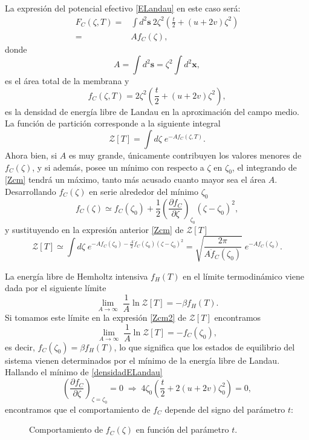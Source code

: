 La expresión del potencial efectivo \eqref{ELandau} en este caso será:
\begin{align}
  F_C(\zeta,T)=&\int\! d^2 \mathbf{s}\ 2\zeta^2\!\left( \frac{t}{2} + (u+2v)\zeta^2\right)\\
  =&Af_C(\zeta),
\end{align}
donde 
$$A=\int d^2 \mathbf{s}=\zeta^2\int d^2 \mathbf{x} ,$$
es el área total de la membrana y 
\begin{equation}\label{densidadELandau}
f_C(\zeta,T)=2\zeta^2\!\left( \frac{t}{2} + (u+2v)\zeta^2\right),
\end{equation}
es la densidad de energía libre de Landau en la aproximación del campo medio. 
La función de partición corresponde a la siguiente integral
\begin{equation}\label{Zcm}
 \mathcal{Z}[T]=\int d\zeta\;e^{-Af_C(\zeta,T)}.
\end{equation}
Ahora bien, si $A$ es muy grande, únicamente contribuyen los valores menores de
$f_C(\zeta)$, y si además, posee un mínimo con respecto a $\zeta$ en
$\zeta_0$, el integrando de \eqref{Zcm} tendrá un máximo,
tanto más acusado cuanto mayor sea el área $A$. Desarrollando $f_C(\zeta)$ en
serie alrededor del mínimo $\zeta_0$
\begin{equation*}
f_C(\zeta)\simeq f_C(\zeta_0)+\frac{1}{2}\left(\frac{\partial f_C}{\partial \zeta}\right)_{\!\zeta_0}(\zeta-\zeta_0)^2,
\end{equation*}
y sustituyendo en la expresión anterior \eqref{Zcm} de $\mathcal{Z}[T]$ 
\begin{equation}\label{Zcm2}
 \mathcal{Z}[T]\simeq\int
 d\zeta\;e^{-Af_C(\zeta_0)-\frac{A}{2}\ddot{f}_C(\zeta_0)(\zeta-\zeta_0)^2}=
 \sqrt{\frac{2\pi}{A\ddot{f}_C(\zeta_0)}}\; e^{-Af_C(\zeta_0)}.
\end{equation}

La energía libre de Hemholtz intensiva $f_H(T)$ en el límite termodinámico
viene dada por el siguiente límite
\begin{equation*}
\lim_{A\rightarrow \infty}\; \frac{1}{A} \ln \mathcal{Z}[T]=-\beta f_H(T).
\end{equation*}
Si tomamos este límite en la expresión \eqref{Zcm2} de $\mathcal{Z}[T]$
encontramos
\begin{equation*}
\lim_{A\rightarrow \infty}\; \frac{1}{A} \ln \mathcal{Z}[T]=-f_C(\zeta_0),
\end{equation*}
es decir, $f_C(\zeta_0)=\beta f_H(T)$, lo que significa que los estados de
equilibrio del sistema vienen determinados por el mínimo de la energía libre
de Landau. Hallando el mínimo de \eqref{densidadELandau} 
\begin{equation*}
\left(\frac{\partial f_C}{\partial \zeta}\right)_{\!\zeta=\zeta_0}\!=0 \;
\Rightarrow \; 4\zeta_0\left(\frac{t}{2}+2(u+2v)\zeta_0^2\right)=0,
\end{equation*}
encontramos que el comportamiento de $f_C$ depende del signo del parámetro $t$:
\begin{figure}[h]
\centering
 \resizebox{\columnwidth}{!}{}
\caption{Comportamiento de $f_C(\zeta)$ en función del parámetro $t$.}
\end{figure} 

